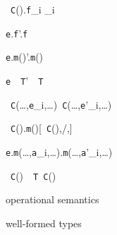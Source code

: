 \begin{figure*}
\vspace{-\bigskipamount}
\begin{minipage}{.4\textwidth}
\quad{}
	{\new~{\tt C}().{\tt f}_i _i}

	{{\tt e}.{\tt f}'.{\tt f}}

	{{\tt e}.{\tt m}()'.{\tt m}()}

	{{\tt e}~\as~{\tt T}'~\as~{\tt T}}
\end{minipage}%
\begin{minipage}{.6\textwidth}
\quad{}
	{\new~{\tt C}(\ldots,{\tt e}_i,\ldots)\derives\new~{\tt C}(\ldots,{\tt e}'_i,\ldots)}

	{\new~{\tt C}().{\tt m}()[\new~{\tt C}(),/\this,]}

	{{\tt e}.{\tt m}(\ldots,{\tt a}_i,\ldots).{\tt m}(\ldots,{\tt a}'_i,\ldots)}

	{\new~{\tt C}()~\as~{\tt T}\derives\new~{\tt C}()}
\end{minipage}
\caption{\FX{} operational semantics}
\label{fig:sos}
\end{figure*}


\begin{figure*}
\vspace{-\bigskipamount}
\begin{minipage}{.5\textwidth}
\quad{}

  {}
\end{minipage}%
\begin{minipage}{.5\textwidth}
\quad{}
	{}

        {}
\end{minipage}
\caption{\FX{} well-formed types}
\label{fig:well}
\end{figure*}

